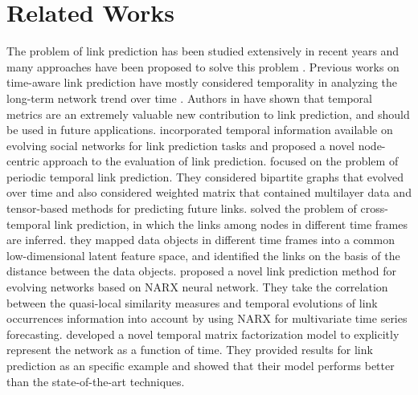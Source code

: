 \section{Related Works}\label{sec:related}

The problem of link prediction has been studied extensively in recent years and many approaches have been proposed to solve this problem \cite{2015arXiv151101868L,wang2015link,wang2014review}.
Previous works on time-aware link prediction have mostly considered temporality in analyzing the long-term network trend over time \cite{dhote2013survey}. Authors in \cite{potgieter2009temporality} have shown that temporal metrics are an extremely valuable new contribution to link prediction, and should be used in future applications. \cite{tylenda2009towards} incorporated temporal information available on evolving social networks for link prediction tasks and proposed a novel node-centric approach to the evaluation of link prediction. \cite{dunlavy2011temporal} focused on the problem of periodic temporal link prediction. They considered bipartite graphs that evolved over time and also considered weighted matrix that contained multilayer data and tensor-based methods for predicting future links. \cite{oyama2011cross} solved the problem of cross-temporal link prediction, in which the links among nodes in different time frames are inferred. they mapped data objects in different time frames into a common low-dimensional latent feature space, and identified the links on the basis of the distance between the data objects. \cite{ozcan2016temporal} proposed a novel link prediction method for evolving networks based on NARX neural network. They take the correlation between the quasi-local similarity measures and temporal evolutions of link occurrences information into account by using NARX for multivariate time series forecasting. \cite{yu2017temporally} developed a novel temporal matrix factorization model to explicitly represent the network as a function of time. They provided results for link prediction as an specific example and showed that their model performs better than the state-of-the-art techniques.

